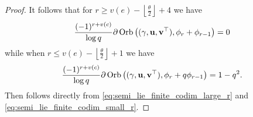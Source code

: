 \begin{proof}
  It follows that for $r \ge v(e) - \left\lfloor \frac{\theta}{2} \right\rfloor + 4$ we have
  \begin{equation}
    \frac{(-1)^{r+v(c)}}{\log q}
    \partial \operatorname{Orb} \left( {(\gamma, \mathbf u, \mathbf v^\top)}, \phi_r + \phi_{r-1} \right) = 0
    \label{eq:semi_lie_finite_codim_large_r}
  \end{equation}
  while when $r \le v(e) - \left\lfloor \frac{\theta}{2} \right\rfloor + 1$ we have
  \begin{equation}
    \frac{(-1)^{r+v(c)}}{\log q}
    \partial \operatorname{Orb} \left( {(\gamma, \mathbf u, \mathbf v^\top)}, \phi_r + q\phi_{r-1} \right)
    = 1-q^2.
    \label{eq:semi_lie_finite_codim_small_r}
  \end{equation}
  Then  follows directly
  from \eqref{eq:semi_lie_finite_codim_large_r} and \eqref{eq:semi_lie_finite_codim_small_r}.
\end{proof}
